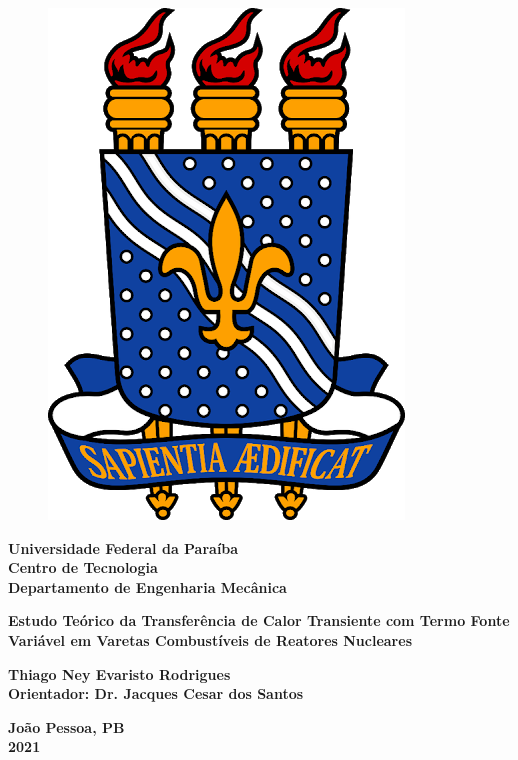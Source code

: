 \begin{titlepage}
    \begin{center}
        \begin{figure}[H]
            \centering
            \includegraphics[scale=0.125]{figures/ufpb.png}
        \end{figure}
        
        {\large
        \textbf{Universidade Federal da Paraíba \\
        Centro de Tecnologia \\
        Departamento de Engenharia Mecânica \\}}
        
        \vspace{5cm}
        
        {\Large
        \textbf{Estudo Teórico da Transferência de Calor Transiente com Termo Fonte Variável em Varetas Combustíveis de Reatores Nucleares}}
        
        \vspace{5cm}
        
        {\large
        \textbf{
        Thiago Ney Evaristo Rodrigues \\
        Orientador: Dr. Jacques Cesar dos Santos \\}}
        
        \vspace{3cm}
        
        {\large
        \textbf{
        João Pessoa, PB \\
        2021 \\}}
    \end{center}
\end{titlepage}